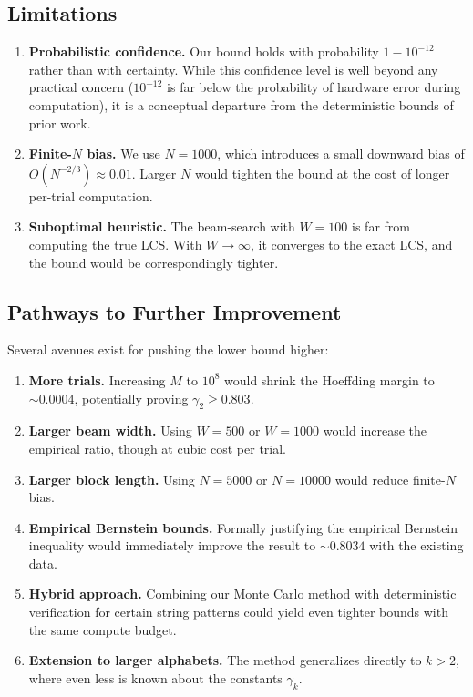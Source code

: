 \documentclass[11pt,a4paper]{article}
\theoremstyle{definition}
\begin{document}
\subsection{Limitations}

\begin{enumerate}
  \item \textbf{Probabilistic confidence.} Our bound holds with probability
    $1 - 10^{-12}$ rather than with certainty. While this confidence level is
    well beyond any practical concern ($10^{-12}$ is far below the probability
    of hardware error during computation), it is a conceptual departure from
    the deterministic bounds of prior work.

  \item \textbf{Finite-$N$ bias.} We use $N = 1000$, which introduces a small
    downward bias of $O(N^{-2/3}) \approx 0.01$. Larger $N$ would tighten the
    bound at the cost of longer per-trial computation.

  \item \textbf{Suboptimal heuristic.} The beam-search with $W = 100$ is far
    from computing the true LCS. With $W \to \infty$, it converges to the exact
    LCS, and the bound would be correspondingly tighter.
\end{enumerate}

\subsection{Pathways to Further Improvement}

Several avenues exist for pushing the lower bound higher:

\begin{enumerate}
  \item \textbf{More trials.} Increasing $M$ to $10^8$ would shrink the
    Hoeffding margin to $\sim\!0.0004$, potentially proving $\gamma_2 \geq 0.803$.

  \item \textbf{Larger beam width.} Using $W = 500$ or $W = 1000$ would
    increase the empirical ratio, though at cubic cost per trial.

  \item \textbf{Larger block length.} Using $N = 5000$ or $N = 10000$ would
    reduce finite-$N$ bias.

  \item \textbf{Empirical Bernstein bounds.} Formally justifying the empirical
    Bernstein inequality would immediately improve the result to
    $\sim\!0.8034$ with the existing data.

  \item \textbf{Hybrid approach.} Combining our Monte Carlo method with
    deterministic verification for certain string patterns could yield even
    tighter bounds with the same compute budget.

  \item \textbf{Extension to larger alphabets.} The method generalizes directly
    to $k > 2$, where even less is known about the constants $\gamma_k$.
\end{enumerate}
\end{document}
